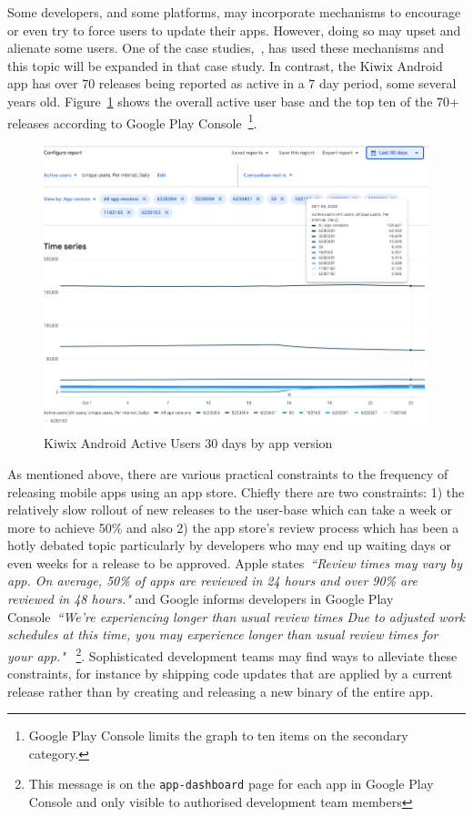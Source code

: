 Some developers, and some platforms, may incorporate mechanisms to encourage or even try to force users to update their apps. However, doing so may upset and alienate some users. One of the case studies,~\href{section-greentech-apps}{\emph{}}, has used these mechanisms and this topic will be expanded in that case study. In contrast, the Kiwix Android app has over 70 releases being reported as active in a 7 day period, some several years old. Figure~\ref{fig:kiwix-30d-active-users} shows the overall active user base and the top ten of the 70+ releases according to Google Play Console~\footnote{Google Play Console limits the graph to ten items on the secondary category.}.

\begin{figure}
    \centering
    \includegraphics[width=15.5cm]{images/android-vitals-screenshots/kiwix-ActiveUsers-30-days-2020-10-29.png}
    \caption{Kiwix Android Active Users 30 days by app version}
    \label{fig:kiwix-30d-active-users}
\end{figure}

As mentioned above, there are various practical constraints to the frequency of releasing mobile apps using an app store. Chiefly there are two constraints: 1) the relatively slow rollout of new releases to the user-base which can take a week or more to achieve 50\% and also 2) the app store's review process which has been a hotly debated topic particularly by developers who may end up waiting days or even weeks for a release to be approved. Apple states~\emph{``Review times may vary by app. On average, 50\% of apps are reviewed in 24 hours and over 90\% are reviewed in 48 hours."} and Google informs developers in Google Play Console~\emph{``We're experiencing longer than usual review times
Due to adjusted work schedules at this time, you may experience longer than usual review times for your app."} ~\footnote{This message is on the \texttt{app-dashboard} page for each app in Google Play Console and only visible to authorised development team members}. Sophisticated development teams may find ways to alleviate these constraints, for instance by shipping code updates that are applied by a current release rather than by creating and releasing a new binary of the entire app.

